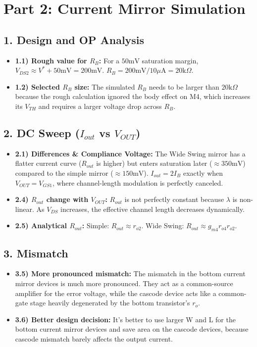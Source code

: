 \documentclass[12pt,a4paper]{article}
\begin{document}
\section*{Part 2: Current Mirror Simulation}
\subsection*{1. Design and OP Analysis}
\begin{itemize}
    \item \textbf{1.1) Rough value for $R_B$:} For a $50\text{mV}$ saturation margin, $V_{DS2} \approx V^* + 50\text{mV} = 200\text{mV}$. $R_B = 200\text{mV} / 10\mu\text{A} = 20\text{k}\Omega$.
    \item \textbf{1.2) Selected $R_B$ size:} The simulated $R_B$ needs to be larger than $20\text{k}\Omega$ because the rough calculation ignored the body effect on M4, which increases its $V_{TH}$ and requires a larger voltage drop across $R_B$.
\end{itemize}

\subsection*{2. DC Sweep ($I_{out}$ vs $V_{OUT}$)}
\begin{itemize}
    \item \textbf{2.1) Differences \& Compliance Voltage:} The Wide Swing mirror has a flatter current curve ($R_{out}$ is higher) but enters saturation later ($\approx 350\text{mV}$) compared to the simple mirror ($\approx 150\text{mV}$). $I_{out} = 2 I_B$ exactly when $V_{OUT} = V_{GS1}$, where channel-length modulation is perfectly canceled.
    \item \textbf{2.4) $R_{out}$ change with $V_{OUT}$:} $R_{out}$ is not perfectly constant because $\lambda$ is non-linear. As $V_{DS}$ increases, the effective channel length decreases dynamically.
    \item \textbf{2.5) Analytical $R_{out}$:} Simple: $R_{out} \approx r_{o2}$. Wide Swing: $R_{out} \approx g_{m4} r_{o4} r_{o2}$.
\end{itemize}

\subsection*{3. Mismatch}
\begin{itemize}
    \item \textbf{3.5) More pronounced mismatch:} The mismatch in the bottom current mirror devices is much more pronounced. They act as a common-source amplifier for the error voltage, while the cascode device acts like a common-gate stage heavily degenerated by the bottom transistor's $r_o$.
    \item \textbf{3.6) Better design decision:} It's better to use larger W and L for the bottom current mirror devices and save area on the cascode devices, because cascode mismatch barely affects the output current.
\end{itemize}
\end{document}
